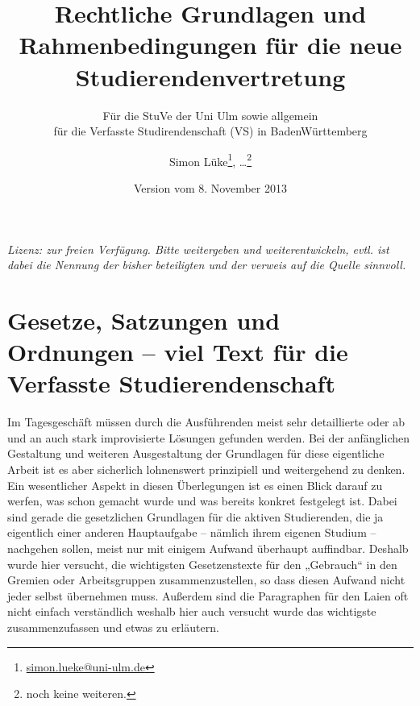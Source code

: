 \documentclass[
10pt,
a4paper,
twoside,								%
titlepage=false,							%
draft=false								%
]{scrartcl}
\begin{document}
\titlehead{\href{http://www.uni-ulm.de/stuve}{StudierendenVertretung, uulm}}

\subject{\textsc{ARBEITSENTWURF}}

\title{Rechtliche Grundlagen und Rahmenbedingungen für die neue Studierendenvertretung}
\subtitle{Für die StuVe der Uni Ulm sowie allgemein\\für die Verfasste Studirendenschaft (VS) in BadenWürttemberg}
\author{Simon Lüke\thanks{\href{mailto:simon.lueke@uni-ulm.de}{simon.lueke@uni-ulm.de}}, …\thanks{noch keine weiteren.}}
\date{Version vom 8. November 2013}

\maketitle

\tableofcontents

\vspace{1.5cm}

\begin{center}
	\textit{Lizenz: zur freien Verfügung. Bitte weitergeben und weiterentwickeln, evtl. ist dabei die Nennung der bisher beteiligten und der verweis auf die Quelle sinnvoll.}
\end{center}

\newpage

\setcounter{section}{-1}
\section{Gesetze, Satzungen und Ordnungen – viel Text für die Verfasste Studierendenschaft}

Im Tagesgeschäft müssen durch die Ausführenden meist sehr detaillierte oder ab und an auch stark improvisierte Lösungen gefunden werden. Bei der anfänglichen Gestaltung und weiteren Ausgestaltung der Grundlagen für diese eigentliche Arbeit ist es aber sicherlich lohnenswert prinzipiell und weitergehend zu denken. Ein wesentlicher Aspekt in diesen Überlegungen ist es einen Blick darauf zu werfen, was schon gemacht wurde und was bereits konkret festgelegt ist. Dabei sind gerade die gesetzlichen Grundlagen für die aktiven Studierenden, die ja eigentlich einer anderen Hauptaufgabe – nämlich ihrem eigenen Studium – nachgehen sollen, meist nur mit einigem Aufwand überhaupt auffindbar. Deshalb wurde hier versucht, die wichtigsten Gesetzenstexte für den „Gebrauch“ in den Gremien oder Arbeitsgruppen zusammenzustellen, so dass diesen Aufwand nicht jeder selbst übernehmen muss. Außerdem sind die Paragraphen für den Laien oft nicht einfach verständlich weshalb hier auch versucht wurde das wichtigste zusammenzufassen und etwas zu erläutern.
\end{document}
